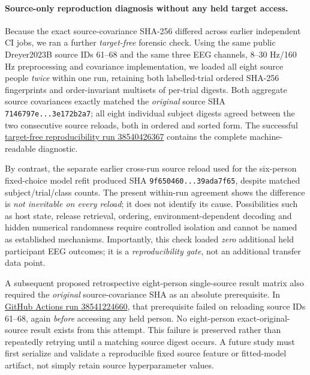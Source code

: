 \paragraph{Source-only reproduction diagnosis without any held target access.}
\label{sec:p3-dreyer-source-drift-retest}
Because the exact source-covariance SHA-256 differed across
earlier independent CI jobs, we ran a further \emph{target-free}
forensic check. Using the same public Dreyer2023B
source IDs 61--68 and the same three EEG channels,
8--30 Hz/160 Hz preprocessing and covariance
implementation, we loaded all eight source people
\emph{twice} within one run, retaining both
labelled-trial ordered SHA-256 fingerprints and
order-invariant multisets of per-trial digests.
Both aggregate source covariances exactly matched
the \emph{original} source SHA
\texttt{7146797e...3e172b2a7}; all eight
individual subject digests agreed between the
two consecutive source reloads, both in
ordered and sorted form. The successful
\href{https://github.com/lindicaphxag-tech/kaggle/actions/runs/38540426367}
{target-free reproducibility run 38540426367}
contains the complete machine-readable diagnostic.

By contrast, the separate earlier cross-run
source reload used for the six-person
fixed-choice model refit produced SHA
\texttt{9f650460...39ada7f65}, despite matched
subject/trial/class counts. The present
within-run agreement shows the difference
is \emph{not inevitable on every reload};
it does not identify its cause. Possibilities
such as host state, release retrieval,
ordering, environment-dependent decoding
and hidden numerical randomness require
controlled isolation and cannot be named
as established mechanisms. Importantly,
this check loaded \emph{zero} additional
held participant EEG outcomes; it is a
\emph{reproducibility gate}, not an
additional transfer data point.

A subsequent proposed retrospective eight-person
single-source result matrix also required the
\emph{original} source-covariance SHA as an
absolute prerequisite. In
\href{https://github.com/lindicaphxag-tech/kaggle/actions/runs/38541224660}
{GitHub Actions run 38541224660}, that prerequisite
failed on reloading source IDs 61--68, again
\emph{before} accessing any held person.
No eight-person exact-original-source result
exists from this attempt. This failure is
preserved rather than repeatedly retrying
until a matching source digest occurs.
A future study must first serialize and
validate a reproducible fixed source feature
or fitted-model artifact, not simply retain
source hyperparameter values.
